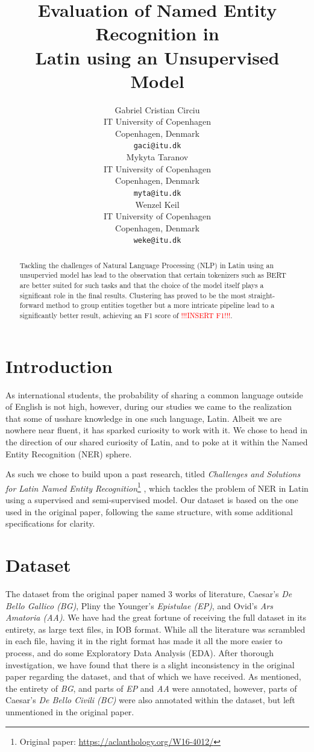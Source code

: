\documentclass[11pt]{article}
\title{Evaluation of Named Entity Recognition in \\ Latin using an Unsupervised Model}
\author{
  Gabriel Cristian Circiu \\
  IT University of Copenhagen \\ Copenhagen, Denmark \\
  \texttt{gaci@itu.dk} \\\And
  Mykyta Taranov \\
  IT University of Copenhagen \\ Copenhagen, Denmark \\
  \texttt{myta@itu.dk} \\\And
  Wenzel Keil \\
  IT University of Copenhagen \\ Copenhagen, Denmark \\
  \texttt{weke@itu.dk}
}
\begin{document}
\maketitle
\begin{abstract}
Tackling the challenges of Natural Language Processing (NLP) in Latin using an unsupervied model has lead to the observation that certain tokenizers 
such as BERT are better suited for such tasks and that the choice of the model itself plays a significant role in the final results.
Clustering has proved to be the most straight-forward method to group entities together but a more intricate pipeline lead to a significantly 
better result, achieving an F1 score of \textcolor{red}{!!!INSERT F1!!!}.
\end{abstract}

\section{Introduction}

As international students, the probability of sharing a common language outside of English is not high, however, during our studies we came to the 
realization that some of usshare knowledge in one such language, Latin. Albeit we are nowhere near fluent, it has sparked curiosity to work with it.
We chose to head in the direction of our shared curiosity of Latin, and to poke at it within the Named Entity Recognition (NER) sphere.

As such we chose to build upon a past research, titled 
\textit{Challenges and Solutions for Latin Named Entity Recognition}\footnote{Original paper: \url{https://aclanthology.org/W16-4012/}}
\cite{erdmann-etal-2016-challenges}, which tackles the problem of NER in Latin using a supervised and semi-supervised model.
Our dataset is based on the one used in the original paper, following the same structure, with some additional specifications for clarity.

\section{Dataset}

The dataset from the original paper named 3 works of literature, Caesar's \textit{De Bello Gallico (BG)}, Pliny the Younger's \textit{Epistulae (EP)},
and Ovid's \textit{Ars Amatoria (AA)}. We have had the great fortune of receiving the full dataset in its entirety, as large text files, in IOB format.
While all the literature was scrambled in each file, having it in the right format has made it all the more easier to process, and do some
Exploratory Data Analysis (EDA). After thorough investigation, we have found that there is a slight inconsistency in the original paper regarding 
the dataset, and that of which we have received. As mentioned, the entirety of \textit{BG}, and parts of \textit{EP} and \textit{AA} were annotated,
however, parts of Caesar's \textit{De Bello Civili (BC)} were also annotated within the dataset, but left unmentioned in the original paper.
\end{document}
